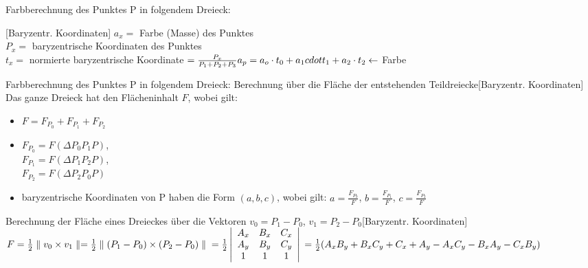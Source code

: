 \documentclass[a7paper,print]{kartei}
\begin{document}
\begin{karte}[CGIS]{Farbberechnung des Punktes P in folgendem Dreieck: }[Baryzentr. Koordinaten]
\noindent $a_x =$ Farbe (Masse) des Punktes \\
$P_x =$ baryzentrische Koordinaten des Punktes \\
$t_x =$ normierte baryzentrische Koordinate $= \frac{P_x}{P_1+P_2+P_3}\\
a_p = a_o \cdot t_0 + a_1 cdot t_1 + a_2 \cdot t_2 \leftarrow$ Farbe
\end{karte}

\begin{karte}[CGIS]{Farbberechnung des Punktes P in folgendem Dreieck: Berechnung über die Fläche der entstehenden Teildreiecke}[Baryzentr. Koordinaten]
\noindent Das ganze Dreieck hat den Flächeninhalt $F$, wobei gilt:
\begin{itemize}
\item $F=F_{P_0} + F_{P_1} + F_{P_2}$
\item $F_{P_0} = F(\Delta P_0P_1P)$, \\$F_{P_1} = F(\Delta P_1P_2P)$, \\$F_{P_2} = F(\Delta P_2P_0P)$
\item baryzentrische Koordinaten von P haben die Form $(a,b,c)$, wobei gilt: $a=\frac{F_{P_0}}{F}$, $b=\frac{F_{P_1}}{F}$, $c=\frac{F_{P_2}}{F}$
\end{itemize}
\end{karte}

\begin{karte}[CGIS]{Berechnung der Fläche eines Dreieckes über die Vektoren $v_0=P_1-P_0$, $v_1=P_2-P_0$}[Baryzentr. Koordinaten]
$F=\frac{1}{2} \parallel v_0 \times v_1 \parallel = \frac{1}{2} \parallel (P_1-P_0) \times (P_2 - P_0) \parallel \\
= \frac{1}{2} \left| \begin{array}{ccc}
A_x & B_x & C_x \\
A_y & B_y & C_y \\
1 & 1& 1
\end{array}
\right|\\
 = \frac{1}{2} (A_xB_y + B_xC_y + C_x+A_y - A_xC_y - B_xA_y - C_xB_y)$
\end{karte}
\end{document}
